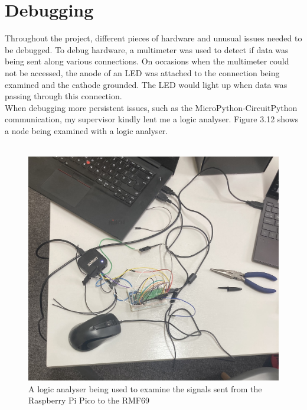 \documentclass[12pt,a4paper]{report}
\begin{document}
\section{Debugging}
Throughout the project, different pieces of hardware and unusual issues needed to be debugged. To debug hardware, a multimeter was used to detect if data was being sent along various connections. On occasions when the multimeter could not be accessed, the anode of an LED was attached to the connection being examined and the cathode grounded. The LED would light up when data was passing through this connection. \\
When debugging more persistent issues, such as the MicroPython-CircuitPython communication, my supervisor kindly lent me a logic analyser. Figure 3.12 shows a node being examined with a logic analyser. \\ \\ 
\begin{figure}[h]
\begin{center}
\includegraphics[scale=0.2]{logicAnalyser.jpeg}
\end{center}
\caption{A logic analyser being used to examine the signals sent from the Raspberry Pi Pico to the RMF69}
\end{figure}
\end{document}
